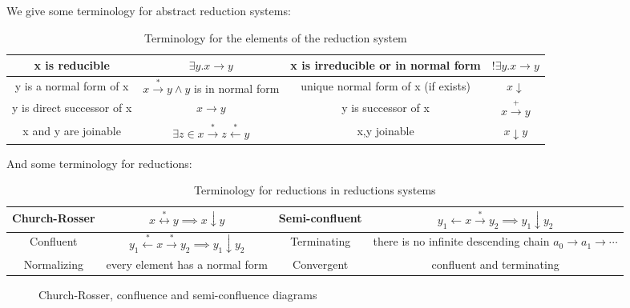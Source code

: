 We give some terminology for abstract reduction systems:

\begin{table}[H]
\centering
\begin{tabular}{|| c | c | c | c ||}
\hline
\hline x is reducible & $\exists y. x \to y$ & 
x is irreducible or in normal form  & $!\exists y. x \to y$ \\
\hline y is a normal form of x & $x \stackrel{*}{\rightarrow} y \land y$ is in normal form & unique normal form of x (if exists) & $x\downarrow$ \\
\hline y is direct successor of x & $x \to y$ &
y is successor of x & $x \stackrel{+}{\rightarrow} y$ \\
\hline x and y are joinable & $\exists z \in x \stackrel{*}{\rightarrow} z \stackrel{*}{\leftarrow} y$ & x,y joinable & $x \downarrow y$ \\
\hline
\end{tabular}
\caption{Terminology for the elements of the reduction system}
\label{table:notation2}
\end{table}


And some terminology for reductions:

\begin{table}[H]
\centering
\begin{adjustwidth}{-2cm}{}
\begin{tabular}{|| c | c | c | c ||}
\hline
\hline Church-Rosser & $x \stackrel{*}{\leftrightarrow} y \implies x \downarrow y$ & Semi-confluent & $y_1 \leftarrow x \stackrel{*}{\rightarrow} y_2 \implies y_1 \downarrow y_2$ \\
\hline Confluent & $y_1 \stackrel{*}{\leftarrow} x \stackrel{*}{\rightarrow} y_2 \implies y_1 \downarrow y_2$ & Terminating & there is no infinite descending chain $a_0 \to a_1 \to \cdots$ \\
\hline Normalizing & every element has a normal form & Convergent & confluent and terminating \\
\hline
\end{tabular}
\end{adjustwidth}
\caption{Terminology for reductions in reductions systems}
\label{table:notation3}
\end{table}

\begin{figure}[H]
\centering
{}
\caption{Church-Rosser, confluence and semi-confluence diagrams}
\end{figure}

